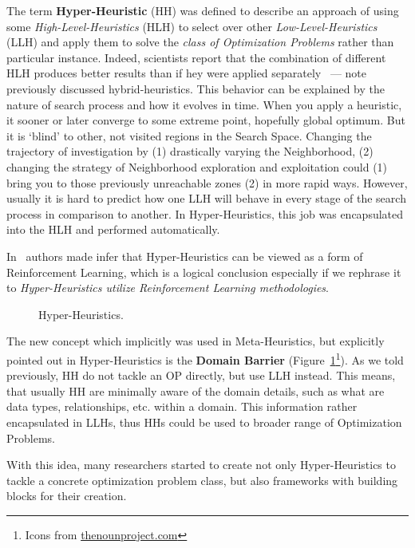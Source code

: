 The term \textbf{Hyper-Heuristic} (HH) was defined to describe an approach of using some \textit{High-Level-Heuristics} (HLH) to select over other \textit{Low-Level-Heuristics} (LLH) and apply them to solve the \textit{class of Optimization Problems} rather than particular instance. Indeed, scientists report that the combination of different HLH produces better results than if hey were applied separately~\cite{drake2019recent} — note previously discussed hybrid-heuristics.
This behavior can be explained by the nature of search process and how it evolves in time. When you apply a heuristic, it sooner or later converge to some extreme point, hopefully global optimum. But it is `blind' to other, not visited regions in the Search Space. Changing the trajectory of investigation by (1) drastically varying the Neighborhood, (2) changing the strategy of Neighborhood exploration and exploitation could (1) bring you to those previously unreachable zones (2) in more rapid ways. However, usually it is hard to predict how one LLH will behave in every stage of the search process in comparison to another. In Hyper-Heuristics, this job was encapsulated into the HLH and performed automatically. 

In~\cite{moriarty1999evolutionary} authors made infer that Hyper-Heuristics can be viewed as a form of Reinforcement Learning, which is a logical conclusion especially if we rephrase it to \textit{Hyper-Heuristics utilize Reinforcement Learning methodologies}.

\begin{figure}
	\centering
	
	\caption[Hyper-Heuristics]{Hyper-Heuristics.}
	\label{bg:pic:HH}
\end{figure}

The new concept which implicitly was used in Meta-Heuristics, but explicitly pointed out in Hyper-Heuristics is the \textbf{Domain Barrier} (Figure~\ref{bg:pic:HH}\footnote{Icons from \href{https://thenounproject.com/}{thenounproject.com}}).
As we told previously, HH do not tackle an OP directly, but use LLH instead. This means, that usually HH are minimally aware of the domain details, such as what are data types, relationships, etc. within a domain. This information rather encapsulated in LLHs, thus HHs could be used to broader range of Optimization Problems.

With this idea, many researchers started to create not only Hyper-Heuristics to tackle a concrete optimization problem class, but also frameworks with building blocks for their creation.


